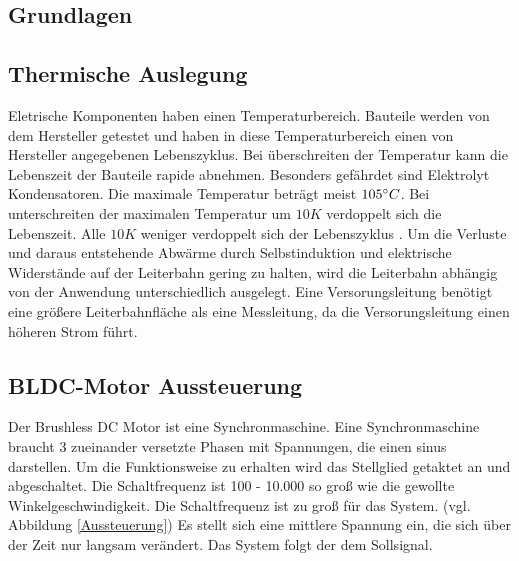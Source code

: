 \documentclass[10pt,a4paper,oneside,abstracton]{scrartcl}
\begin{document}
\begin{multicols}{2}
\section{Grundlagen}
\subsection{Thermische Auslegung}
Eletrische Komponenten haben einen Temperaturbereich. 
Bauteile werden von dem Hersteller getestet und haben in diese Temperaturbereich einen von Hersteller angegebenen Lebenszyklus. 
Bei überschreiten der Temperatur kann die Lebenszeit der Bauteile rapide abnehmen. 
Besonders gefährdet sind Elektrolyt Kondensatoren. 
Die maximale Temperatur beträgt meist $ 105 \degree C $. \newline
Bei unterschreiten der maximalen Temperatur um $ 10K $ verdoppelt sich die Lebenszeit. 
Alle $ 10K $ weniger verdoppelt sich der Lebenszyklus \cite{Elko}. 
\newline
Um die Verluste und daraus entstehende Abwärme durch Selbstinduktion und elektrische Widerstände  auf der Leiterbahn gering zu halten,
wird die Leiterbahn abhängig von der Anwendung unterschiedlich ausgelegt.
\newline
Eine Versorungsleitung benötigt eine größere Leiterbahnfläche als eine Messleitung, da die Versorungsleitung einen höheren Strom führt. 

\subsection{BLDC-Motor Aussteuerung}
Der Brushless DC Motor ist eine Synchronmaschine. 
Eine Synchronmaschine braucht 3 zueinander versetzte Phasen mit Spannungen, die einen sinus darstellen.
Um die Funktionsweise zu erhalten wird das Stellglied getaktet an und abgeschaltet. 
Die Schaltfrequenz ist 100 - 10.000 so groß wie die gewollte Winkelgeschwindigkeit. 
Die Schaltfrequenz ist zu groß für das System. (vgl. Abbildung \ref*{Aussteuerung})
\newline
Es stellt sich eine mittlere Spannung ein, die sich über der Zeit nur langsam verändert.
Das System folgt der dem Sollsignal.


\end{multicols}
\end{document}

